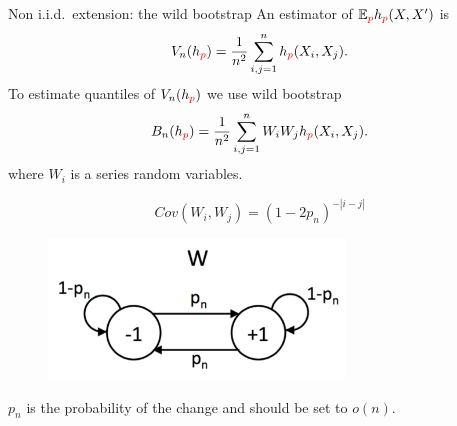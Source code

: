 \begin{frame}
\begin{columns}
\begin{column}{.33\linewidth}
\vspace{-0.75cm}
\begin{block}{Non i.i.d.\ extension: the wild bootstrap}
An estimator of $\mathbb{E}_{\color{red} p} h_{\color{red} p}(X,X')$ is  
\[
 V_n(h_{\color{red} p}) = \frac {1} {n^2} \sum_{i,j=1}^n h_{\color{red} p}(X_i,X_j).
\]
To estimate quantiles of $ V_n(h_{\color{red} p})$ we use wild bootstrap
\[
 B_n(h_{\color{red} p}) = \frac {1} {n^2} \sum_{i,j=1}^n W_i W_j h_{\color{red} p}(X_i,X_j).
\]
  where $W_i$ is a  series  random variables.
\begin{center}
  \begin{minipage}{.49\linewidth}
       $$
  Cov(W_i,W_j) = (1-2p_n)^{-|i-j|}
  $$
\end{minipage}
\begin{minipage}{.49\linewidth}
 \begin{figure}
            \vspace{-0.5cm}
           \includegraphics[width=0.7\textwidth, angle =0 ]{../../presentation/img/W_graphicalModel.pdf} 
        \end{figure}
\end{minipage}
\end{center}
  $p_n$ is  the probability of the change  and should be set to $o(n)$.

\begin{center}


\end{center}
\end{block}
\end{column}
\end{columns}
\end{frame}
